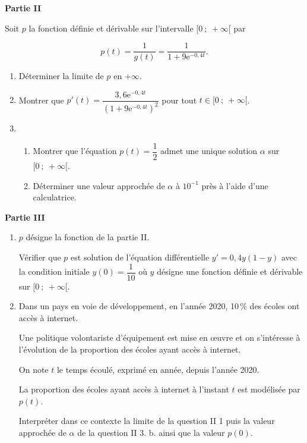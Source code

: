\documentclass[11pt]{article}
\newcommand{\e}{\text{e}}
\begin{document}
\bigskip

\textbf{Partie II}

\medskip

Soit $p$ la fonction définie et dérivable sur l'intervalle $[0~;~+ \infty[$ par 

\[p(t) = \dfrac{1}{g(t)} = \dfrac{1}{1 + 9\e^{-0,4t}}.\]

\smallskip

\begin{enumerate}
\item Déterminer la limite de $p$ en $+ \infty$. 
\item Montrer que $p'(t) = \dfrac{3,6\e^{-0,4t}}{ \left(1 + 9\e^{-0,4t}\right)^2}$ pour tout $t \in  [0~;~+ \infty[$.

\item  
	\begin{enumerate}
		\item Montrer que l'équation $p(t) = \dfrac{1}{2}$ admet une unique solution $\alpha$ sur $[0~;~+ \infty[$. 
		\item Déterminer une valeur approchée de $\alpha$ à $10^{-1}$ près à l'aide d'une calculatrice.
	\end{enumerate}
\end{enumerate}

\bigskip

\textbf{Partie III}

\medskip

\begin{enumerate}
\item $p$ désigne la fonction de la partie II.

Vérifier que $p$ est solution de l'équation différentielle $y' = 0,4y(1 - y)$ avec la condition initiale 
$y(0) = \dfrac{1}{10}$ où $y$ désigne une fonction définie et dérivable sur $[0~;~ + \infty[$.
\item Dans un pays en voie de développement, en l'année 2020, 10\,\% des écoles ont accès à internet. 

Une politique volontariste d'équipement est mise en œuvre et on s'intéresse à l'évolution de la proportion des écoles ayant accès à internet. 

On note $t$ le temps écoulé, exprimé en année, depuis l'année 2020.

La proportion des écoles ayant accès à internet à l'instant $t$ est modélisée par $p(t)$.

Interpréter dans ce contexte la limite de la question II 1 puis la valeur approchée de $\alpha$ de la question II 3. b. ainsi que la valeur $p(0)$.
\end{enumerate}
\end{document}
